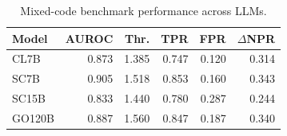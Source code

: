 \begin{table}[t]
\centering
\caption{Mixed-code benchmark performance across LLMs.}
\label{tab:mixedcode-overall}
\begin{tabular}{lrrrrr}
\toprule
Model & AUROC & Thr. & TPR & FPR & $\Delta$NPR \\
\midrule
CL7B & 0.873 & 1.385 & 0.747 & 0.120 & 0.314 \\
SC7B & 0.905 & 1.518 & 0.853 & 0.160 & 0.343 \\
SC15B & 0.833 & 1.440 & 0.780 & 0.287 & 0.244 \\
GO120B & 0.887 & 1.560 & 0.847 & 0.187 & 0.340 \\
\bottomrule
\end{tabular}
\end{table}
